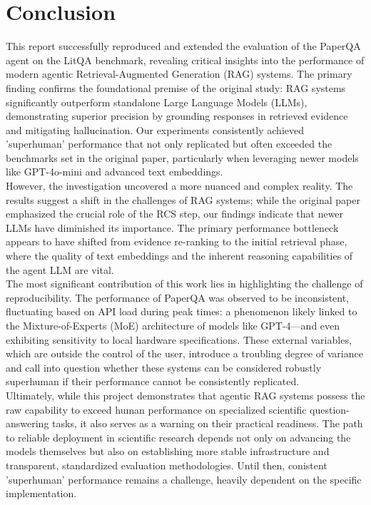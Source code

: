 \section{Conclusion}
\label{sec:conclusion}
This report successfully reproduced and extended the evaluation of the PaperQA agent on the LitQA benchmark, revealing critical insights into the performance of modern agentic Retrieval-Augmented Generation (RAG) systems. The primary finding confirms the foundational premise of the original study: RAG systems significantly outperform standalone Large Language Models (LLMs), demonstrating superior precision by grounding responses in retrieved evidence and mitigating hallucination. Our experiments consistently achieved 'superhuman' performance that not only replicated but often exceeded the benchmarks set in the original paper, particularly when leveraging newer models like GPT-4o-mini and advanced text embeddings. \\

However, the investigation uncovered a more nuanced and complex reality. The results suggest a shift in the challenges of RAG systems; while the original paper emphasized the crucial role of the RCS step, our findings indicate that newer LLMs have diminished its importance. The primary performance bottleneck appears to have shifted from evidence re-ranking to the initial retrieval phase, where the quality of text embeddings and the inherent reasoning capabilities of the agent LLM are vital. \\

The most significant contribution of this work lies in highlighting the challenge of reproducibility. The performance of PaperQA was observed to be inconsistent, fluctuating based on API load during peak times: a phenomenon likely linked to the Mixture-of-Experts (MoE) architecture of models like GPT-4—and even exhibiting sensitivity to local hardware specifications. These external variables, which are outside the control of the user, introduce a troubling degree of variance and call into question whether these systems can be considered robustly superhuman if their performance cannot be consistently replicated.\\

Ultimately, while this project demonstrates that agentic RAG systems possess the raw capability to exceed human performance on specialized scientific question-answering tasks, it also serves as a warning on their practical readiness. The path to reliable deployment in scientific research depends not only on advancing the models themselves but also on establishing more stable infrastructure and transparent, standardized evaluation methodologies. Until then, conistent 'superhuman' performance remains a challenge, heavily dependent on the specific implementation.\\

